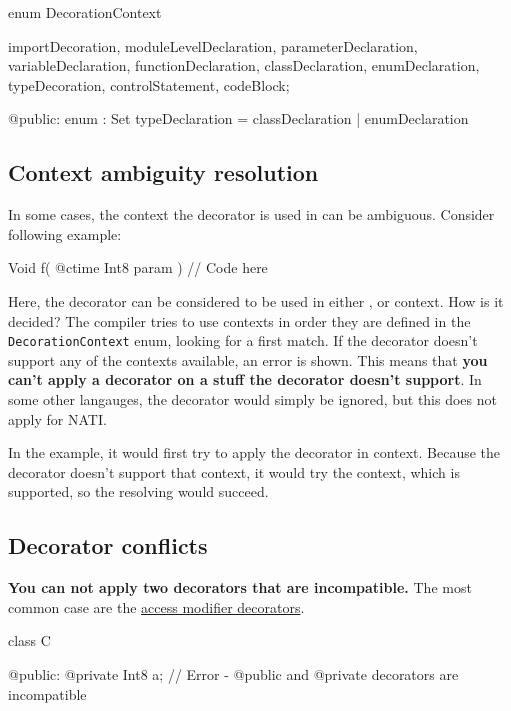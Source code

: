 \begin{code}
enum DecorationContext {
	importDecoration,
	moduleLevelDeclaration,
	parameterDeclaration,
	variableDeclaration,
	functionDeclaration,
	classDeclaration,
	enumDeclaration,
	typeDecoration,
	controlStatement,
	codeBlock;
	
@public:
	enum : Set {
		typeDeclaration = classDeclaration | enumDeclaration	
	}
}
\end{code} \label{enum:DecorationContext}

\subsection{Context ambiguity resolution} In some cases, the context the decorator is used in can be ambiguous. Consider following example:
\begin{code}
Void f( @ctime Int8 param ) {
	// Code here
}
\end{code}

Here, the  decorator can be considered to be used in either ,  or  context. How is it decided? The compiler tries to use contexts in order they are defined in the \verb|DecorationContext| enum, looking for a first match. If the decorator doesn't support any of the contexts available, an error is shown. This means that \textbf{you can't apply a decorator on a stuff the decorator doesn't support}. In some other langauges, the decorator would simply be ignored, but this does not apply for NATI.

In the example, it would first try to apply the decorator in   context. Because the  decorator doesn't support that context, it would try the   context, which is supported, so the resolving would succeed.

\subsection{Decorator conflicts}
\textbf{You can not apply two decorators that are incompatible.} The most common case are the \hyperref[accessModifierDecorators]{access modifier decorators}.
\begin{code}
class C {

@public:
	@private Int8 a; // Error - @public and @private decorators are incompatible
	
}
\end{code}

